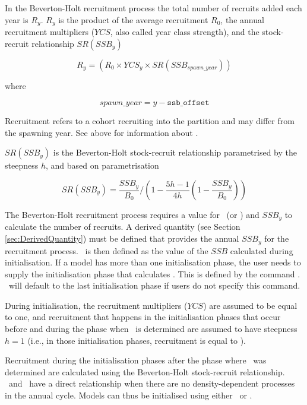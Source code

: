 In the Beverton-Holt recruitment process the total number of recruits added each year is $R_y$. $R_y$ is the product of the average recruitment $R_0$, the annual recruitment multipliers ($YCS$, also called year class strength), and the stock-recruit relationship $SR(SSB_y)$


\begin{equation}\label{eq:BH}
R_{y} = (R_0 \times YCS_{y} \times SR(SSB_{spawn\_year}))
\end{equation}

where

\begin{equation}\label{eq:year_class}
spawn\_year = y - \texttt{ssb\_offset}
\end{equation}

Recruitment refers to a cohort recruiting into the partition and may differ from the spawning year. See above for information about .

$SR(SSB_y)$ is the Beverton-Holt stock-recruit relationship parametrised by the steepness $h$, and based on \cite{mace_doonan_88} parametrisation

\begin{equation}\label{eq:BH_SR}
SR(SSB_y) = \frac{SSB_y}{B_0} / \left( 1-\frac{5h-1}{4h} \left( 1-\frac{SSB_y}{B_0} \right) \right)
\end{equation}

The Beverton-Holt recruitment process requires a value for \Bzero\ (or \Rzero) and $SSB_y$ to calculate the number of recruits. A derived quantity (see Section \ref{sec:DerivedQuantity}) must be defined that provides the annual $SSB_y$ for the recruitment process. \Bzero\ is then defined as the value of the $SSB$ calculated during initialisation. If a model has more than one initialisation phase, the user needs to supply the initialisation phase that calculates \Bzero. This is defined by the command . \CNAME\ will default to the last initialisation phase if users do not specify this command.

During initialisation, the recruitment multipliers ($YCS$) are assumed to be equal to one, and recruitment that happens in the initialisation phases that occur before and during the phase when \Bzero\ is determined are assumed to have steepness $h=1$ (i.e., in those initialisation phases, recruitment is equal to \Rzero).

Recruitment during the initialisation phases after the phase where \Bzero\ was determined are calculated using the Beverton-Holt stock-recruit relationship. \Rzero\ and \Bzero\ have a direct relationship when there are no density-dependent processes in the annual cycle. Models can thus be initialised using either \Bzero\ or \Rzero.

